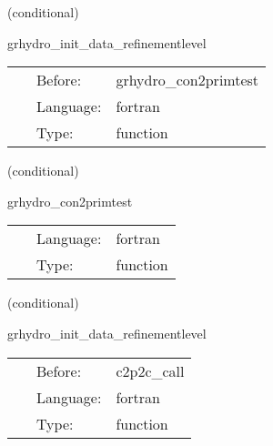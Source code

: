 \documentclass{article}
\begin{document}
   (conditional) 

\hspace{5mm} grhydro\_init\_data\_refinementlevel 

\hspace{5mm}{\it calculate current refinement level } 


\hspace{5mm}

 \begin{tabular*}{160mm}{cll} 
~ & Before:  & grhydro\_con2primtest \\ 
~ & Language:  & fortran \\ 
~ & Type:  & function \\ 
\end{tabular*} 


\vspace{5mm}

   (conditional) 

\hspace{5mm} grhydro\_con2primtest 

\hspace{5mm}{\it testing the conservative to primitive solver } 


\hspace{5mm}

 \begin{tabular*}{160mm}{cll} 
~ & Language:  & fortran \\ 
~ & Type:  & function \\ 
\end{tabular*} 


\vspace{5mm}

   (conditional) 

\hspace{5mm} grhydro\_init\_data\_refinementlevel 

\hspace{5mm}{\it calculate current refinement level } 


\hspace{5mm}

 \begin{tabular*}{160mm}{cll} 
~ & Before:  & c2p2c\_call \\ 
~ & Language:  & fortran \\ 
~ & Type:  & function \\ 
\end{tabular*} 
\end{document}
